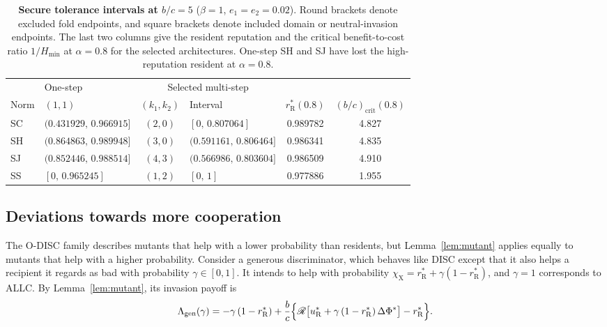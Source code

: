 \documentclass[10pt]{wlscirep}
\newif\ifdraftnotes
\DeclareRobustCommand{\draftnote}[1]{%
  \ifdraftnotes{\color{red!60!black}\sffamily\footnotesize[#1]}\fi}
\newcommand{\Rmap}{\mathscr{R}}            %
\newcommand{\rR}{r_{\mathrm{R}}^{*}}
\newcommand{\uR}{u_{\mathrm{R}}^{*}}
\newcommand{\dPhi}{\Delta\Phi^{*}}
\newcommand{\Hmin}{H_{\min}}
\theoremstyle{plain}
\theoremstyle{remark}
\begin{document}
\begin{table}[!htbp]
\centering
\caption{\textbf{Secure tolerance intervals at $b/c=5$} ($\beta=1$, $e_1=e_2=0.02$). Round brackets denote excluded fold endpoints, and square brackets denote included domain or neutral-invasion endpoints. The last two columns give the resident reputation and the critical benefit-to-cost ratio $1/\Hmin$ at $\alpha=0.8$ for the selected architectures. One-step SH and SJ have lost the high-reputation resident at $\alpha=0.8$.}
\label{tab:si-secure}
\small
\begin{tabular}{@{}llclcc@{}}
\toprule
 & One-step & \multicolumn{2}{c}{Selected multi-step} & & \\
\cmidrule(lr){3-4}
Norm & $(1,1)$ & $(k_1,k_2)$ & Interval & $\rR(0.8)$ & $(b/c)_{\mathrm{crit}}(0.8)$\\
\midrule
SC & $(0.431929,\,0.966915]$ & $(2,0)$ & $[0,\,0.807064]$ & 0.989782 & 4.827\\
SH & $(0.864863,\,0.989948]$ & $(3,0)$ & $(0.591161,\,0.806464]$ & 0.986341 & 4.835\\
SJ & $(0.852446,\,0.988514]$ & $(4,3)$ & $(0.566986,\,0.803604]$ & 0.986509 & 4.910\\
SS & $[0,\,0.965245]$ & $(1,2)$ & $[0,\,1]$ & 0.977886 & 1.955\\
\bottomrule
\end{tabular}
\end{table}

\subsection{Deviations towards more cooperation}
\label{si:generous}
\draftnote{This subsection is new in revision 3, and the numbers in Supplementary Table~\ref{tab:si-generous} were reproduced on 25 November 2026 with an independent implementation (analysis/independent\_checks/meanfield\_check.py) and should be added to the verified package before submission.}

The O-DISC family describes mutants that help with a lower probability than residents, but Lemma~\ref{lem:mutant} applies equally to mutants that help with a higher probability. Consider a generous discriminator, which behaves like DISC except that it also helps a recipient it regards as bad with probability $\gamma\in[0,1]$. It intends to help with probability $\chi_{\mathrm X}=\rR+\gamma(1-\rR)$, and $\gamma=1$ corresponds to ALLC. By Lemma~\ref{lem:mutant}, its invasion payoff is
\begin{equation}
\Lambda_{\mathrm{gen}}(\gamma)=-\gamma\,(1-\rR)+\frac{b}{c}\Bigl\{\Rmap\bigl[\uR+\gamma\,(1-\rR)\,\dPhi\bigr]-\rR\Bigr\}.
\label{eq:s-generous}
\end{equation}
\end{document}
